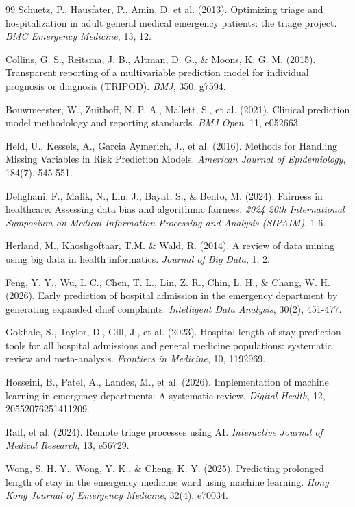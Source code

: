\documentclass[harvard,article]{frontiersinFPHY_FAMS}
\begin{document}
\begin{thebibliography}{99}
 Schuetz, P., Hausfater, P., Amin, D. et al. (2013). Optimizing triage and hospitalization in adult general medical emergency patients: the triage project. \textit{BMC Emergency Medicine}, 13, 12.

 Collins, G. S., Reitsma, J. B., Altman, D. G., \& Moons, K. G. M. (2015). Transparent reporting of a multivariable prediction model for individual prognosis or diagnosis (TRIPOD). \textit{BMJ}, 350, g7594.

 Bouwmeester, W., Zuithoff, N. P. A., Mallett, S., et al. (2021). Clinical prediction model methodology and reporting standards. \textit{BMJ Open}, 11, e052663.

 Held, U., Kessels, A., Garcia Aymerich, J., et al. (2016). Methods for Handling Missing Variables in Risk Prediction Models. \textit{American Journal of Epidemiology}, 184(7), 545-551.

 Dehghani, F., Malik, N., Lin, J., Bayat, S., \& Bento, M. (2024). Fairness in healthcare: Assessing data bias and algorithmic fairness. \textit{2024 20th International Symposium on Medical Information Processing and Analysis (SIPAIM)}, 1-6.

 Herland, M., Khoshgoftaar, T.M. \& Wald, R. (2014). A review of data mining using big data in health informatics. \textit{Journal of Big Data}, 1, 2.

 Feng, Y. Y., Wu, I. C., Chen, T. L., Lin, Z. R., Chin, L. H., \& Chang, W. H. (2026). Early prediction of hospital admission in the emergency department by generating expanded chief complaints. \textit{Intelligent Data Analysis}, 30(2), 451-477.

 Gokhale, S., Taylor, D., Gill, J., et al. (2023). Hospital length of stay prediction tools for all hospital admissions and general medicine populations: systematic review and meta-analysis. \textit{Frontiers in Medicine}, 10, 1192969.

 Hosseini, B., Patel, A., Landes, M., et al. (2026). Implementation of machine learning in emergency departments: A systematic review. \textit{Digital Health}, 12, 20552076251411209.

 Raff, et al. (2024). Remote triage processes using AI. \textit{Interactive Journal of Medical Research}, 13, e56729.

 Wong, S. H. Y., Wong, Y. K., \& Cheng, K. Y. (2025). Predicting prolonged length of stay in the emergency medicine ward using machine learning. \textit{Hong Kong Journal of Emergency Medicine}, 32(4), e70034.


\end{thebibliography}
\end{document}
